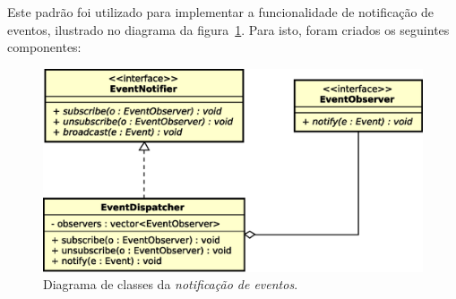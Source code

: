 Este padrão foi utilizado para implementar a funcionalidade de notificação de
eventos, ilustrado no diagrama da figura~\ref{fig:diagram:notification}. Para
isto, foram criados os seguintes componentes:

\begin{figure}[htb!]
  \centering
  \includegraphics[scale=0.6]{img/EventNotifier}
  \caption{Diagrama de classes da \textit{notificação de eventos}.}
\label{fig:diagram:notification}
\end{figure}

